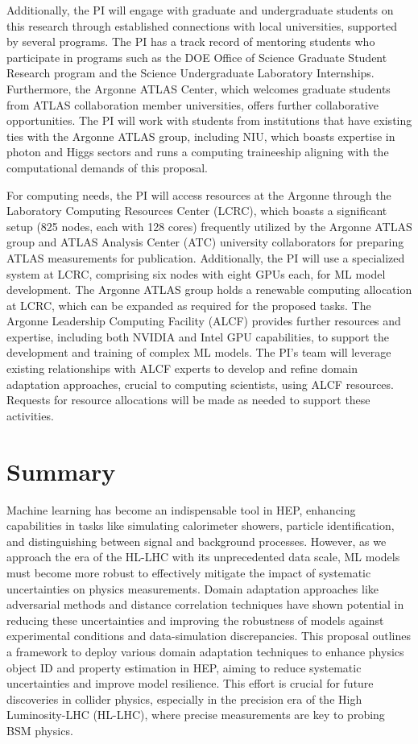 \documentclass[letter, USenglish, 11pt, subfigure]{article}
\begin{document}
Additionally, the PI will engage with graduate and undergraduate students on this research through established connections with local universities, supported by several programs. The PI has a track record of mentoring students who participate in programs such as the DOE Office of Science Graduate Student Research program and the Science Undergraduate Laboratory Internships. Furthermore, the Argonne ATLAS Center, which welcomes graduate students from ATLAS collaboration member universities, offers further collaborative opportunities. The PI will work with students from institutions that have existing ties with the Argonne ATLAS group, including NIU, which boasts expertise in photon and Higgs sectors and runs a computing traineeship aligning with the computational demands of this proposal.

For computing needs, the PI will access resources at the Argonne through the Laboratory Computing Resources Center (LCRC), which boasts a significant setup (825 nodes, each with 128 cores) frequently utilized by the Argonne ATLAS group and ATLAS Analysis Center (ATC) university collaborators for preparing ATLAS measurements for publication. Additionally, the PI will use a specialized system at LCRC, comprising six nodes with eight GPUs each, for ML model development. The Argonne ATLAS group holds a renewable computing allocation at LCRC, which can be expanded as required for the proposed tasks. The Argonne Leadership Computing Facility (ALCF) provides further resources and expertise, including both NVIDIA and Intel GPU capabilities, to support the development and training of complex ML models. The PI's team will leverage existing relationships with ALCF experts to develop and refine domain adaptation approaches, crucial to computing scientists, using ALCF resources. Requests for resource allocations will be made as needed to support these activities.

\section{Summary}
Machine learning has become an indispensable tool in HEP, enhancing capabilities in tasks like simulating calorimeter showers, particle identification, and distinguishing between signal and background processes. However, as we approach the era of the HL-LHC with its unprecedented data scale, ML models must become more robust to effectively mitigate the impact of systematic uncertainties on physics measurements.  Domain adaptation approaches like adversarial methods and distance correlation techniques have shown potential in reducing these uncertainties and improving the robustness of models against experimental conditions and data-simulation discrepancies. This proposal outlines a framework to deploy various domain adaptation techniques to enhance physics object ID and property estimation in HEP, aiming to reduce systematic uncertainties and improve model resilience. This effort is crucial for future discoveries in collider physics, especially in the precision era of the High Luminosity-LHC (HL-LHC), where precise measurements are key to probing BSM physics.
\end{document}
